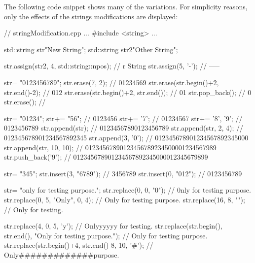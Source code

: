 The following code snippet shows many of the variations. For simplicity reasons, only the effects of the strings modifications are displayed:


\begin{cpp}
// stringModification.cpp
...
#include <string>
...

std::string str{"New String"};
std::string str2{"Other String"};

str.assign(str2, 4, std::string::npos); // r String
str.assign(5, '-'); // -----

str= {"0123456789"};
str.erase(7, 2); // 01234569
str.erase(str.begin()+2, str.end()-2); // 012
str.erase(str.begin()+2, str.end()); // 01
str.pop_back(); // 0
str.erase(); //

str= "01234";
str+= "56"; // 0123456
str+= '7'; // 01234567
str+= {'8', '9'}; // 0123456789
str.append(str); // 01234567890123456789
str.append(str, 2, 4); // 012345678901234567892345
str.append(3, '0'); // 012345678901234567892345000
str.append(str, 10, 10); // 01234567890123456789234500001234567989
str.push_back('9'); // 012345678901234567892345000012345679899

str= {"345"};
str.insert(3, "6789"); // 3456789
str.insert(0, "012"); // 0123456789

str= {"only for testing purpose."};
str.replace(0, 0, "0"); // 0nly for testing purpose.
str.replace(0, 5, "Only", 0, 4); // Only for testing purpose.
str.replace(16, 8, ""); // Only for testing.

str.replace(4, 0, 5, 'y'); // Onlyyyyyy for testing.
str.replace(str.begin(), str.end(), "Only for testing purpose.");
										// Only for testing purpose.
str.replace(str.begin()+4, str.end()-8, 10, '#');
										// Only#############purpose.
\end{cpp}











































